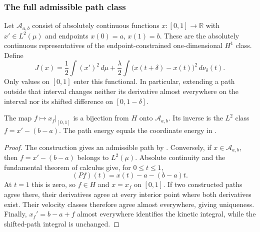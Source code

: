 \subsubsection{The full admissible path class}
\label{sec:variational-admissible}

Let $\mathcal A_{a,b}$ consist of absolutely continuous functions
$x:[0,1]\to\mathbb R$ with $x'\in L^2(\mu)$ and endpoints
$x(0)=a$, $x(1)=b$. These are the absolutely continuous
representatives of the endpoint-constrained one-dimensional $H^1$
class. Define
\[
 J(x)=\frac12\int (x')^2\,d\mu
      +\frac\lambda2\int\bigl(x(t+\delta)-x(t)\bigr)^2\,d\nu_\delta(t).
\]
Only values on $[0,1]$ enter this functional. In particular, extending
a path outside that interval changes neither its derivative almost
everywhere on the interval nor its shifted difference on
$[0,1-\delta]$.

\begin{theorem}
\label{thm:variational-coordinates}
The map $f\mapsto x_f|_{[0,1]}$ is a bijection from $H$ onto
$\mathcal A_{a,b}$. Its inverse is the $L^2$ class
$f=x'-(b-a)$. The path energy equals the coordinate energy in
.
\end{theorem}
\begin{proof}
The construction gives an admissible path by
. Conversely, if $x\in\mathcal A_{a,b}$,
then $f=x'-(b-a)$ belongs to $L^2(\mu)$. Absolute continuity and
the fundamental theorem of calculus give, for $0\le t\le1$,
\[
 (Pf)(t)=x(t)-a-(b-a)t.
\]
At $t=1$ this is zero, so $f\in H$ and $x=x_f$ on $[0,1]$.
If two constructed paths agree there, their derivatives agree at
every interior point where both derivatives exist. Their velocity
classes therefore agree almost everywhere, giving uniqueness.
Finally, $x_f'=b-a+f$ almost everywhere identifies the kinetic
integral, while the shifted-path integral is unchanged.
\end{proof}


